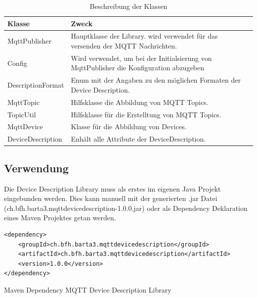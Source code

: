 \begin{table}[H]
\begin{tabularx}{\textwidth}{|l|X|}

 \hline \rowcolor{lightgray}
 {\bf Klasse } & {\bf Zweck } \\  \hline
 
 MqttPublisher & Hauptklasse der Library. wird verwendet für das versenden der MQTT Nachrichten. \\ \hline

 Config & Wird verwendet, um bei der Initialsierung von MqttPublisher die Konfiguration abzugeben \\ \hline
 
 DescriptionFormat & Enum mit der Angaben zu den möglichen Formaten der Device Description.\\ \hline
 
 MqttTopic & Hilfsklasse die Abbildung von MQTT Topics.\\ \hline
 
 TopicUtil & Hilfsklasse für die Erstelltung von MQTT Topics.\\ \hline
 
 MqttDevice & Klasse für die Abbildung von Devices. \\ \hline
 
 DeviceDescription & Enhält alle Attribute der DeviceDescription.  \\ \hline
 
\end{tabularx}
\caption{Beschreibung der Klassen}
\end{table}

\subsection{Verwendung}
Die Device Description Library muss als erstes im eigenen Java Projekt eingebunden werden. Dies kann manuell mit der generierten .jar Datei (ch.bfh.barta3.mqttdevicedescription-1.0.0.jar) oder als Dependency Deklaration eines Maven Projektes getan werden.

\begin{listing}[H]
\begin{verbatim}
<dependency>
	<groupId>ch.bfh.barta3.mqttdevicedescription</groupId>
	<artifactId>ch.bfh.barta3.mqttdevicedescription</artifactId>
	<version>1.0.0</version>
</dependency>
\end{verbatim}
\caption{Maven Dependency MQTT Device Description Library}
\end{listing}

